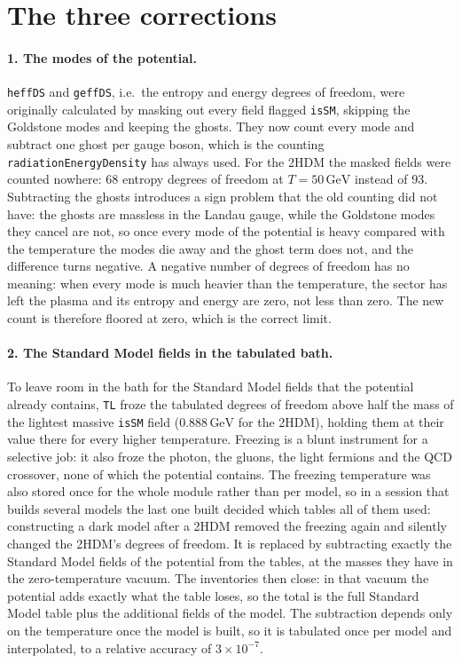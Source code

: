 \documentclass[11pt,a4paper]{article}
\newcommand{\code}[1]{\texttt{#1}}
\renewcommand{\_}{\oldunderscore\allowbreak}
\begin{document}
\section{The three corrections}

\paragraph{1. The modes of the potential.} \code{h\_eff\_DS} and \code{g\_eff\_DS}, i.e.~the
entropy and energy degrees of freedom, were originally calculated by masking out
every field flagged \code{is\_SM}, skipping the Goldstone modes and keeping the ghosts. They now
count every mode and subtract one ghost per gauge boson, which is the counting
\code{radiationEnergyDensity} has always used. For the 2HDM the masked fields were counted
nowhere: 68 entropy degrees of freedom at $T = 50\,\text{GeV}$ instead of 93. Subtracting the
ghosts introduces a sign problem that the old counting did not have: the ghosts are massless in
the Landau gauge, while the Goldstone modes they cancel are not, so once every mode of the
potential is heavy compared with the temperature the modes die away and the ghost term does
not, and the difference turns negative. A negative number of degrees of freedom has no
meaning: when every mode is much heavier than the temperature, the sector has left the plasma
and its entropy and energy are zero, not less than zero. The new count is therefore floored at
zero, which is the correct limit.

\paragraph{2. The Standard Model fields in the tabulated bath.} To leave room in the bath for
the Standard Model fields that the potential already contains, \code{TL} froze the tabulated
degrees of freedom above half the mass of the lightest massive \code{is\_SM} field
($0.888\,\text{GeV}$ for the 2HDM), holding them at their value there for every higher
temperature. Freezing is a blunt instrument for a selective job: it also froze the photon, the
gluons, the light fermions and the QCD crossover, none of which the potential contains. The
freezing temperature was also stored once for the whole module rather than per model, so in a
session that builds several models the last one built decided which tables all of them used:
constructing a dark model after a 2HDM removed the freezing again and silently changed the
2HDM's degrees of freedom. It is
replaced by subtracting exactly the Standard
Model fields of the potential from the tables, at the masses they have in the zero-temperature
vacuum. The inventories then close: in that vacuum the potential adds exactly what the table loses,
so the total is the full Standard Model table plus the additional fields of the model. The
subtraction depends only on the temperature once the model is built, so it is tabulated once
per model and interpolated, to a relative accuracy of $3\times10^{-7}$.
\end{document}
